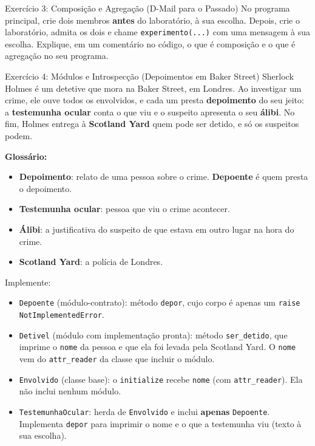 \begin{exercicio}{Exercício 3: Composição e Agregação (D-Mail para o Passado)}
No programa principal, crie dois membros \textbf{antes} do laboratório, à sua escolha. Depois,
crie o laboratório, admita os dois e chame \texttt{experimento(...)} com uma mensagem à sua
escolha. Explique, em um comentário no código, o que é composição e o que é agregação no seu
programa.
\end{exercicio}

\begin{exercicio}{Exercício 4: Módulos e Introspecção (Depoimentos em Baker Street)}
Sherlock Holmes é um detetive que mora na Baker Street, em Londres. Ao investigar um crime, ele
ouve todos os envolvidos, e cada um presta \textbf{depoimento} do seu jeito: a
\textbf{testemunha ocular} conta o que viu e o suspeito apresenta o seu \textbf{álibi}. No fim,
Holmes entrega à \textbf{Scotland Yard} quem pode ser detido, e só os suspeitos podem.

\textbf{Glossário:}
\begin{itemize}
    \item \textbf{Depoimento}: relato de uma pessoa sobre o crime. \textbf{Depoente} é quem
    presta o depoimento.
    \item \textbf{Testemunha ocular}: pessoa que viu o crime acontecer.
    \item \textbf{Álibi}: a justificativa do suspeito de que estava em outro lugar na hora do
    crime.
    \item \textbf{Scotland Yard}: a polícia de Londres.
\end{itemize}

Implemente:

\begin{itemize}
    \item \texttt{Depoente} (módulo-contrato): método \texttt{depor}, cujo corpo é apenas um
    \texttt{raise NotImplementedError}.

    \item \texttt{Detivel} (módulo com implementação pronta): método \texttt{ser\_detido}, que
    imprime o \texttt{nome} da pessoa e que ela foi levada pela Scotland Yard. O \texttt{nome}
    vem do \texttt{attr\_reader} da classe que incluir o módulo.

    \item \texttt{Envolvido} (classe base): o \texttt{initialize} recebe \texttt{nome} (com
    \texttt{attr\_reader}). Ela não inclui nenhum módulo.

    \item \texttt{TestemunhaOcular}: herda de \texttt{Envolvido} e inclui \textbf{apenas}
    \texttt{Depoente}. Implementa \texttt{depor} para imprimir o nome e o que a testemunha viu
    (texto à sua escolha).


\end{itemize}
\end{exercicio}
